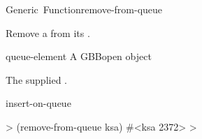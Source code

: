 \documentclass[10pt,twoside,english,pdftex]{article}
\begin{document}
\begin{functiondoc}{Generic~Function}{remove-from-queue}%
  { 
    }
%

\fnsyntax

\fnpurpose Remove a  from its .

\fnmethods
{}%
  {\code{(} 
   \returns{} }

\fnpackage {}

\fnmodule {}

\fnargs
\begin{args}{queue-element}
 A GBBopen  object
\end{args}

\fnreturns The supplied .

\begin{alsos}{insert-on-queue}
\end{alsos}

\fnexample
%
\W\supp
\begin{example}
  > (remove-from-queue ksa)
  #<ksa 2372>
  >
\end{example}

\end{functiondoc}

\end{document}
